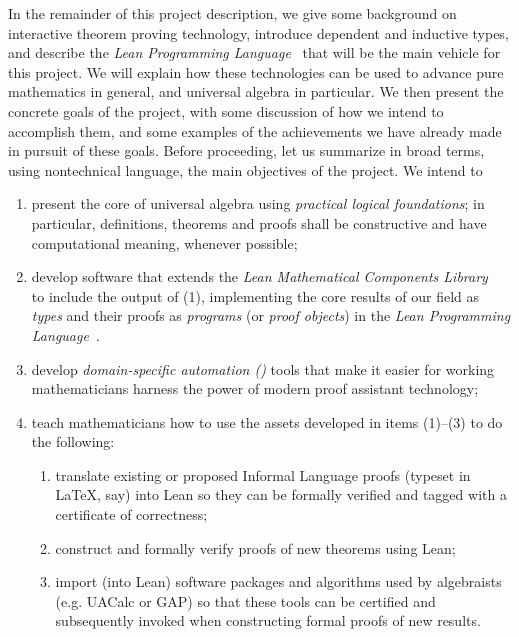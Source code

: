 \documentclass[11pt]{amsart}  %
\begin{document}
In the remainder of this project description, we give some background on interactive theorem proving technology, introduce dependent and inductive types, and describe the \emph{Lean Programming Language}~\cite{lean} that will be the main vehicle for this project. We will explain how these technologies can be used to advance pure mathematics in general, and universal algebra in particular. We then present the concrete goals of the project, with some discussion of how we intend to accomplish them, and some examples of the achievements we have already made in pursuit of these goals. Before proceeding, let us summarize in broad terms, using nontechnical language, the main objectives of the project. We intend to
\begin{enumerate}
  \item present the core of universal algebra using \emph{practical logical foundations}; in particular, definitions, theorems and proofs shall be constructive and have computational meaning, whenever possible;
  
  \item develop software that extends the \emph{Lean Mathematical Components Library}~\cite{lean-mathlib:2018} to include the output of (1), implementing the core results of our field as \emph{types} and their proofs as \emph{programs} (or \emph{proof objects}) in the \emph{Lean Programming Language}~\cite{lean,lean-ualib}.
        
  \item develop \emph{domain-specific automation (\dsa)} tools that make it easier for working mathematicians harness the power of modern proof assistant technology;
        
  \item teach mathematicians how to use the assets developed in items (1)--(3)
        to do the following:
  \begin{enumerate}[{\bf a.}]
    \item translate existing or proposed Informal Language proofs (typeset in \LaTeX, say) into Lean so they can be formally verified and tagged with a certificate of correctness;
    \item construct and formally verify proofs of new theorems using Lean;
    \item import (into Lean) software packages and algorithms used by algebraists 
    (e.g. UACalc or GAP) so that these tools can be certified and subsequently 
    invoked when constructing formal proofs of new results.
  \end{enumerate}
\end{enumerate}
\end{document}
